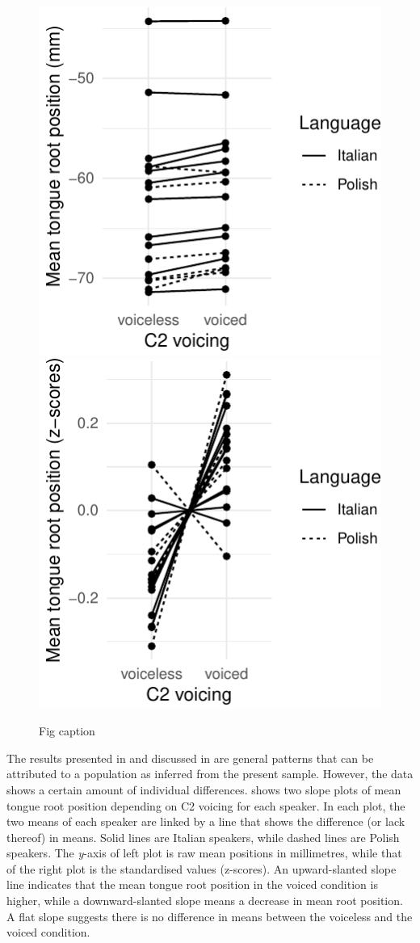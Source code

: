 \documentclass[12pt,]{article}
\begin{document}
\begin{figure}

{\centering \includegraphics[width=.49\linewidth]{2018-tra_files/figure-latex/trp-voicing-plot-1} \includegraphics[width=.49\linewidth]{2018-tra_files/figure-latex/trp-voicing-plot-2} 

}

\caption{Fig caption}\label{f:trp-voicing-plot}
\end{figure}

The results presented in  and discussed in
 are general patterns that can be attributed to a
population as inferred from the present sample. However, the data shows
a certain amount of individual differences. 
shows two slope plots of mean tongue root position depending on C2
voicing for each speaker. In each plot, the two means of each speaker
are linked by a line that shows the difference (or lack thereof) in
means. Solid lines are Italian speakers, while dashed lines are Polish
speakers. The \emph{y}-axis of left plot is raw mean positions in
millimetres, while that of the right plot is the standardised values
(z-scores). An upward-slanted slope line indicates that the mean tongue
root position in the voiced condition is higher, while a
downward-slanted slope means a decrease in mean root position. A flat
slope suggests there is no difference in means between the voiceless and
the voiced condition.
\end{document}
